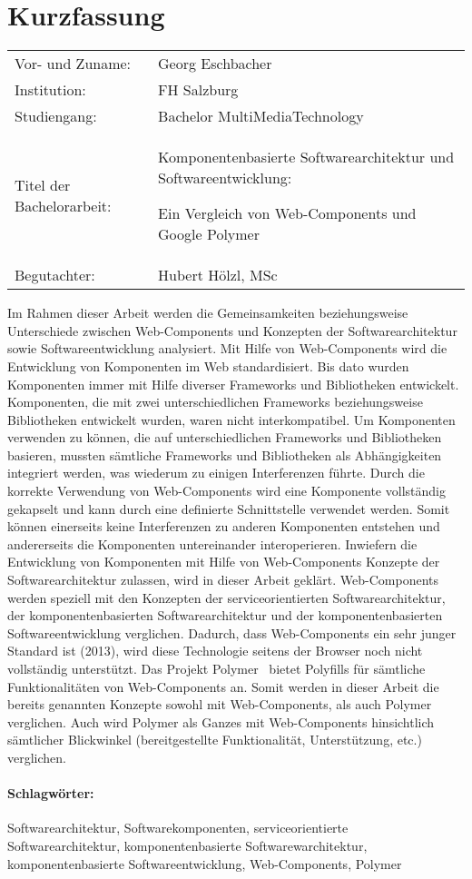 \section*{Kurzfassung}
\begin{tabular}{p{4cm} p{12cm}}
Vor- und Zuname:& Georg Eschbacher\\
Institution: & FH Salzburg\\
Studiengang: &  Bachelor MultiMediaTechnology\\
Titel der Bachelorarbeit: & Komponentenbasierte Softwarearchitektur und Softwareentwicklung: \par Ein Vergleich von Web-Components und Google Polymer\\
Begutachter: & Hubert Hölzl, MSc\\
\end{tabular}
\vspace{0.5cm}

Im Rahmen dieser Arbeit werden die Gemeinsamkeiten beziehungsweise Unterschiede zwischen Web-Components und Konzepten der Softwarearchitektur sowie Softwareentwicklung analysiert. Mit Hilfe von Web-Components wird die Entwicklung von Komponenten im Web standardisiert. Bis dato wurden Komponenten immer mit Hilfe diverser Frameworks und Bibliotheken entwickelt. Komponenten, die mit zwei unterschiedlichen Frameworks beziehungsweise Bibliotheken entwickelt wurden, waren nicht interkompatibel. Um Komponenten verwenden zu können, die auf unterschiedlichen Frameworks und Bibliotheken basieren,  mussten sämtliche Frameworks und Bibliotheken als Abhängigkeiten integriert werden, was wiederum zu einigen Interferenzen führte. Durch die korrekte Verwendung von Web-Components wird eine Komponente vollständig gekapselt und kann durch eine definierte Schnittstelle verwendet werden. Somit können einerseits keine Interferenzen zu anderen Komponenten entstehen und andererseits die Komponenten untereinander interoperieren. Inwiefern die Entwicklung von Komponenten mit Hilfe von Web-Components Konzepte der Softwarearchitektur zulassen, wird in dieser Arbeit geklärt. Web-Components werden speziell mit den Konzepten der serviceorientierten Softwarearchitektur, der komponentenbasierten Softwarearchitektur und der komponentenbasierten Softwareentwicklung verglichen. Dadurch, dass Web-Components ein sehr junger Standard ist (2013), wird diese Technologie seitens der Browser noch nicht vollständig unterstützt. Das Projekt \glqq Polymer \grqq\ bietet Polyfills für sämtliche Funktionalitäten von Web-Components an. Somit werden in dieser Arbeit die bereits genannten Konzepte sowohl mit Web-Components, als auch Polymer verglichen. Auch wird Polymer als Ganzes mit Web-Components hinsichtlich sämtlicher Blickwinkel (bereitgestellte Funktionalität, Unterstützung, etc.) verglichen.

\paragraph{Schlagwörter:}
Softwarearchitektur, Softwarekomponenten, serviceorientierte Softwarearchitektur, komponentenbasierte Softwarewarchitektur, komponentenbasierte Softwareentwicklung, Web-Components, Polymer
